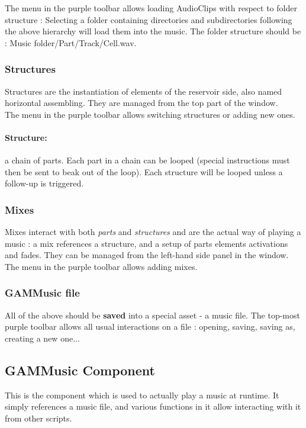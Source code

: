 \documentclass[a4paper,10pt]{article}
\begin{document}
The menu in the purple toolbar allows loading AudioClips with respect to folder structure : Selecting a folder containing directories and subdirectories following the above hierarchy will load them into the music. The folder structure should be : Music folder/Part/Track/Cell.wav.

\subsubsection{Structures}
Structures are the instantiation of elements of the reservoir side, also named horizontal assembling. They are managed from the top part of the window.\\
The menu in the purple toolbar allows switching structures or adding new ones.

\paragraph{Structure: } a chain of parts. Each part in a chain can be looped (special instructions must then be sent to beak out of the loop). Each structure will be looped unless a follow-up is triggered.

\subsubsection{Mixes}
Mixes interact with both \emph{parts} and \emph{structures} and are the actual way of playing a music : a mix references a structure, and a setup of parts elements activations and fades. They can be managed from the left-hand side panel in the window.\\

The menu in the purple toolbar allows adding mixes.

\subsubsection{GAMMusic file}
All of the above should be \textbf{saved} into a special asset - a music file. The top-most purple toolbar allows all usual interactions on a file : opening, saving, saving as, creating a new one...


\subsection{GAMMusic Component}
This is the component which is used to actually play a music at runtime. It simply references a music file, and various functions in it allow interacting with it from other scripts.
\end{document}
